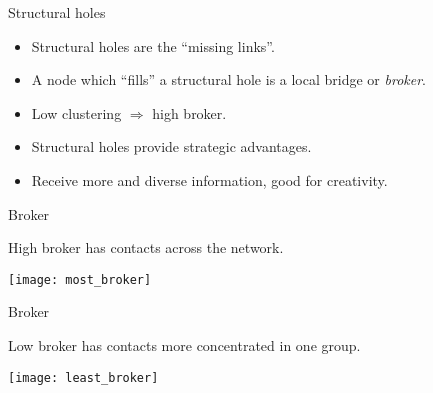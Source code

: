 \documentclass[hide notes,compress]{beamer}
\begin{document}
\begin{frame}[t]{Structural holes}
  \begin{itemize}
    \item Structural holes are the ``missing links''.

    \begin{center}
    \end{center}
    
    \item A node which ``fills'' a structural hole is a local bridge or \emph{broker}.
    \item Low clustering $\Rightarrow$ high broker.
    \item Structural holes provide strategic advantages.
    \item Receive more and diverse information, good for creativity.
  \end{itemize}
\end{frame}

\begin{frame}[t]{Broker}
  \begin{overlayarea}{\linewidth}{5mm}
    High broker has contacts across the network.
  \end{overlayarea}
  \begin{overlayarea}{\linewidth}{\textheight}
      \centering
      \texttt{[image: most\_broker]}
  \end{overlayarea}
\end{frame}

\begin{frame}[t]{Broker}
  \begin{overlayarea}{\linewidth}{5mm}
    Low broker has contacts more concentrated in one group. 
  \end{overlayarea}
  \begin{overlayarea}{\linewidth}{\textheight}
    \centering
    \texttt{[image: least\_broker]}
  \end{overlayarea}
\end{frame}
\end{document}
